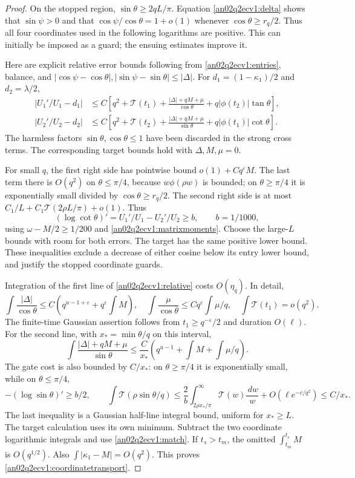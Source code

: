 \documentclass[11pt]{article}
\theoremstyle{remark}\newtheorem{remark}[theorem]{Remark}
\newcommand{\dd}{\,d}
\newcommand{\eps}{\varepsilon}
\begin{document}
\begin{proof}
On the stopped region, $\sin\theta\ge2qL/\pi$.
Equation \eqref{an02q2ecv1:delta} shows that $\sin\psi>0$ and
that $\cos\psi/\cos\theta=1+o(1)$ whenever
$\cos\theta\ge r_q/2$. Thus all four coordinates used in the
following logarithms are positive. This can initially be
imposed as a guard; the ensuing estimates improve it.

Here are explicit relative error bounds following from
\eqref{an02q2ecv1:entries}, balance, and
$|\cos\psi-\cos\theta|,|\sin\psi-\sin\theta|\le|\Delta|$.
For $d_1=(1-\kappa_1)/2$ and $d_2=\lambda/2$,
\begin{align}
 \left|U_1'/U_1-d_1\right|
 &\le C\left[q^2+\mathcal T(t_1)
       +\frac{|\Delta|+qM+\mu}{\cos\theta}
       +q|\phi(t_2)|\tan\theta\right],\nonumber\\
 \left|U_2'/U_2-d_2\right|
 &\le C\left[q^2+\mathcal T(t_2)
       +\frac{|\Delta|+qM+\mu}{\sin\theta}
       +q|\phi(t_1)|\cot\theta\right].
 \label{an02q2ecv1:relative}
\end{align}
The harmless factors $\sin\theta,\cos\theta\le1$ have been
discarded in the strong cross terms. The corresponding target
bounds hold with $\Delta,M,\mu=0$.

For small $q$, the first right side has pointwise bound
$o(1)+Cq^\eps M$. The last term there is $O(q^2)$ on
$\theta\le\pi/4$, because $w\phi(\rho w)$ is bounded; on
$\theta\ge\pi/4$ it is exponentially small divided by
$\cos\theta\ge r_q/2$.
The second right side is at most
$C_1/L+C_1\mathcal T(2\rho L/\pi)+o(1)$.
Thus
\[
 (\log\cot\theta)'=
 U_1'/U_1-U_2'/U_2\ge b,\qquad b=1/1000,
\]
using $\omega-M/2\ge1/200$ and \eqref{an02q2ecv1:matrixmoments}.
Choose the large-$L$ bounds with room for both errors.
The target has the same positive lower bound.
These inequalities exclude a decrease of either cosine below
its entry lower bound, and justify the stopped coordinate guards.

Integration of the first line of \eqref{an02q2ecv1:relative}
costs $O(\eta_q)$. In detail,
\[
 \int\frac{|\Delta|}{\cos\theta}
 \le C(q^{u-1+\eps}+q^\eps\!\int M),\quad
 \int\frac{\mu}{\cos\theta}\le Cq^\eps\!\int\mu/q,
 \quad \int\mathcal T(t_1)=o(q^2).
\]
The finite-time Gaussian assertion follows from
$t_1\ge q^{-\eps}/2$ and duration $O(\ell)$.
For the second line, with $x_*=\min\theta/q$ on this interval,
\[
 \int\frac{|\Delta|+qM+\mu}{\sin\theta}
 \le\frac C{x_*}
       \left(q^{u-1}+\int M+\int\mu/q\right).
\]
The gate cost is also bounded by $C/x_*$:
on $\theta\ge\pi/4$ it is exponentially small, while on
$\theta\le\pi/4$,
\[
 -(\log\sin\theta)'\ge b/2,\qquad
 \int\mathcal T(\rho\sin\theta/q)
 \le \frac2b\int_{2\rho x_*/\pi}^{\infty}
                         \mathcal T(w)\frac{\dd w}{w}
       +O(\ell e^{-c/q^2})\le C/x_*.
\]
The last inequality is a Gaussian half-line integral bound,
uniform for $x_*\ge L$. The target calculation uses its own
minimum. Subtract the two coordinate logarithmic integrals and
use \eqref{an02q2ecv1:match}. If $t_s>t_m$, the omitted
$\int_{t_m}^{t_s}M$ is $O(q^{1/2})$.
Also $\int|\kappa_1-M|=O(q^2)$.
This proves \eqref{an02q2ecv1:coordinatetransport}.


\end{proof}
\end{document}
